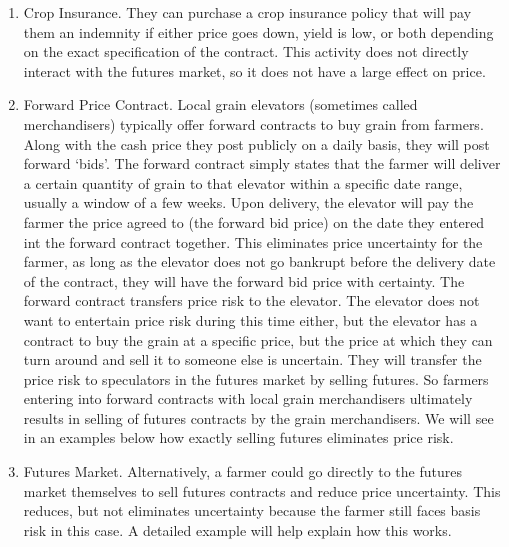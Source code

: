 \documentclass[
  letterpaper,
  DIV=11,
  numbers=noendperiod]{scrreprt}
\begin{document}
\begin{enumerate}
\def\labelenumi{\arabic{enumi}.}
\item
  Crop Insurance. They can purchase a crop insurance policy that will
  pay them an indemnity if either price goes down, yield is low, or both
  depending on the exact specification of the contract. This activity
  does not directly interact with the futures market, so it does not
  have a large effect on price.
\item
  Forward Price Contract. Local grain elevators (sometimes called
  merchandisers) typically offer forward contracts to buy grain from
  farmers. Along with the cash price they post publicly on a daily
  basis, they will post forward `bids'. The forward contract simply
  states that the farmer will deliver a certain quantity of grain to
  that elevator within a specific date range, usually a window of a few
  weeks. Upon delivery, the elevator will pay the farmer the price
  agreed to (the forward bid price) on the date they entered int the
  forward contract together. This eliminates price uncertainty for the
  farmer, as long as the elevator does not go bankrupt before the
  delivery date of the contract, they will have the forward bid price
  with certainty. The forward contract transfers price risk to the
  elevator. The elevator does not want to entertain price risk during
  this time either, but the elevator has a contract to buy the grain at
  a specific price, but the price at which they can turn around and sell
  it to someone else is uncertain. They will transfer the price risk to
  speculators in the futures market by selling futures. So farmers
  entering into forward contracts with local grain merchandisers
  ultimately results in selling of futures contracts by the grain
  merchandisers. We will see in an examples below how exactly selling
  futures eliminates price risk.
\item
  Futures Market. Alternatively, a farmer could go directly to the
  futures market themselves to sell futures contracts and reduce price
  uncertainty. This reduces, but not eliminates uncertainty because the
  farmer still faces basis risk in this case. A detailed example will
  help explain how this works.
\end{enumerate}
\end{document}
